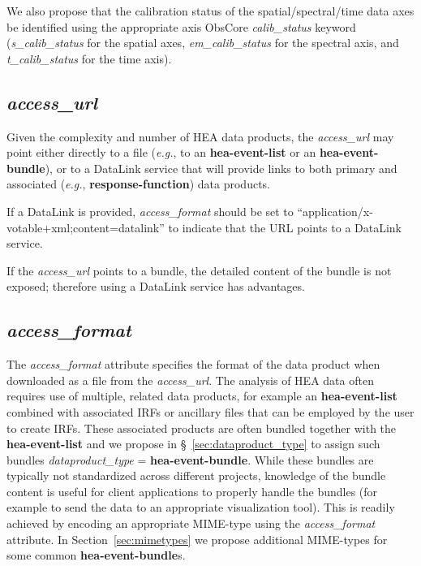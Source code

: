 \documentclass[11pt,a4paper]{ivoa}
\begin{document}
We also propose that the calibration status of the spatial/spectral/time data axes be identified using the appropriate axis ObsCore {\em calib\_status\/} keyword ({\em s\_calib\_status\/} for the spatial axes, {\em em\_calib\_status\/} for the spectral axis, and {\em t\_calib\_status\/} for the time axis).

\subsection{{\em access\_url}}

Given the complexity and number of \gls{HEA} data products, the {\em access\_url\/} may point either directly to a file ({\em e.g.\/}, to an {\bf hea-event-list} or an {\bf hea-event-bundle}), or to a DataLink service that will provide links to both primary and associated ({\em e.g.\/}, {\bf response-function}) data products.

If a DataLink is provided, {\em access\_format\/} should be set to ``application/x-votable+xml;content=datalink'' to indicate that the URL points to a Data\-Link service.

If the {\em access\_url\/} points to a bundle, the detailed content of the bundle is not exposed; therefore using a DataLink service has advantages.

\subsection{{\em access\_format}}

The {\em access\_format\/} attribute specifies the format of the data product when downloaded as a file from the {\em access\_url\/}.  The analysis of \gls{HEA} data often requires use of multiple, related data products, for example an {\bf hea-event-list} combined with associated \glspl{IRF} or ancillary files that can be employed by the user to create \glspl{IRF}\null.  These associated products are often bundled together with the {\bf hea-event-list} and we propose in \S~\ref{sec:dataproduct_type} to assign such bundles {\em dataproduct\_type\/} = {\bf hea-event-bundle}.  While these bundles are typically not standardized across different projects, knowledge of the bundle content is useful for client applications to properly handle the bundles (for example to send the data to an appropriate visualization tool).  This is readily achieved by encoding an appropriate MIME-type using the {\em access\_format\/} attribute.  In Section~\ref{sec:mimetypes} we propose additional MIME-types for some common {\bf hea-event-bundle}s.
\end{document}
